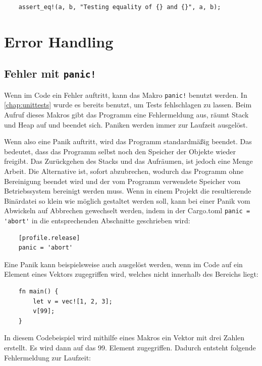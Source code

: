\begin{lstlisting}
    assert_eq!(a, b, "Testing equality of {} and {}", a, b);
\end{lstlisting}


\section{Error Handling}

\subsection{Fehler mit \texttt{panic!}}

Wenn im Code ein Fehler auftritt, kann das Makro \verb"panic!" benutzt werden. In \autoref{chap:unittests} wurde es bereits benutzt, um Tests fehlschlagen zu lassen. Beim Aufruf dieses Makros gibt das Programm eine Fehlermeldung aus, räumt Stack und Heap auf und beendet sich. Paniken werden immer zur Laufzeit ausgelöst.

Wenn also eine Panik auftritt, wird das Programm standardmäßig beendet. Das bedeutet, dass das Programm selbst noch den Speicher der Objekte wieder freigibt. Das Zurückgehen des Stacks und das Aufräumen, ist jedoch eine Menge Arbeit. Die Alternative ist, sofort abzubrechen, wodurch das Programm ohne Be\-rei\-ni\-gung beendet wird und der vom Programm verwendete Speicher vom Be\-triebs\-sys\-tem bereinigt werden muss. Wenn in einem Projekt die resultierende Binärdatei so klein wie möglich gestaltet werden soll, kann bei einer Panik vom \glqq Abwickeln\grqq{} auf \glqq Abbrechen\grqq{} gewechselt werden, indem in der Cargo.toml \verb"panic = 'abort'" in die entsprechenden Abschnitte geschrieben wird:

\begin{lstlisting}
    [profile.release]
    panic = 'abort'
\end{lstlisting}

Eine Panik kann beispielsweise auch ausgelöst werden, wenn im Code auf ein Element eines Vektors zugegriffen wird, welches nicht innerhalb des Bereichs liegt:

\begin{lstlisting}
    fn main() {
        let v = vec![1, 2, 3];
        v[99];
    }
\end{lstlisting}

In diesem Codebeispiel wird mithilfe eines Makros ein Vektor mit drei Zahlen erstellt. Es wird dann auf das 99. Element zugegriffen. Dadurch entsteht folgende Fehlermeldung zur Laufzeit:

